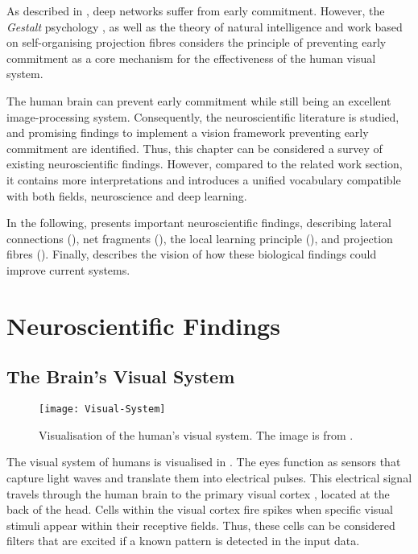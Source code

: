 As described in , deep networks suffer from early commitment.
However, the \emph{Gestalt} psychology \cite{ellis_source_1938, kohler_gestalt_1992, wagemans_century_2012, hamlyn_psychology_2017}, as well as the theory of natural intelligence \cite{von_der_malsburg_theory_2022} and work based on self-organising projection fibres \cite{bienenstock_neural_1987, lades_distortion_1993, wiskott_face_1996, fernandes_self-organization_2015} considers the principle of preventing early commitment as a core mechanism for the effectiveness of the human visual system.

The human brain can prevent early commitment while still being an excellent image-processing system. 
Consequently, the neuroscientific literature is studied, and promising findings to implement a vision framework preventing early commitment are identified.
Thus, this chapter can be considered a survey of existing neuroscientific findings.
However, compared to the related work section, it contains more interpretations and introduces a unified vocabulary compatible with both fields, neuroscience and deep learning.

In the following,  presents important neuroscientific findings, describing lateral connections (), net fragments (), the local learning principle (), and projection fibres ().
Finally,  describes the vision of how these biological findings could improve current systems.



\section{Neuroscientific Findings}

\subsection{The Brain's Visual System}
\begin{figure}[h]
    \centering
    \texttt{[image: Visual-System]}
    \caption[Visualisation of the human's visual system]{Visualisation of the human's visual system. The image is from .}
\end{figure}
%
The visual system of humans is visualised in . The eyes function as sensors that capture light waves and translate them into electrical pulses. This electrical signal travels through the human brain to the primary visual cortex , located at the back of the head.
Cells within the visual cortex fire spikes when specific visual stimuli appear within their receptive fields. Thus, these cells can be considered filters that are excited if a known pattern is detected in the input data. 

